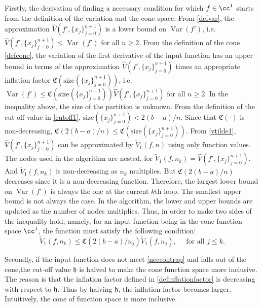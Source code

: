 \documentclass{iitthesis}
\DeclareMathOperator{\Var}{Var}
\theoremstyle{definition}
\theoremstyle{remark}
\begin{document}
Firstly, the derivation of finding a necessary condition for which $f\in\cc^1$ starts from the definition of the variation and the cone space. From \eqref{defvar}, the approximation $\widehat{V}({f'},\{x_j\}_{j=0}^{n+1})$ is a lower bound on $\Var({f'})$, i.e. $\widehat{V}({f'},\{x_j\}_{j=0}^{n+1})\leq \Var({f'})$ for all $n \ge 2$. From the definition of the cone \eqref{defcone}, the variation of the first derivative of the input function has an upper bound in terms of the approximation $\widehat{V}({f'},\{x_j\}_{j=0}^{n+1})$ times an appropriate inflation factor $\mathfrak{C}(\text{size}(\{x_j\}_{j=0}^{n+1}))$, i.e. $\Var({f'})\leq \mathfrak{C}(\text{size}(\{x_j\}_{j=0}^{n+1}))\widehat{V}({f'},\{x_j\}_{j=0}^{n+1})$ for all $n \ge 2$.
In the inequality above, the size of the partition is unknown. From the definition of the cut-off value in \eqref{cutoff1}, $\text{size}(\{x_j\}_{j=0}^{n+1})<2(b-a)/n$. Since that $\mathfrak{C}(\cdot)$ is non-decreasing, $\mathfrak{C}(2(b-a)/n)\leq \mathfrak{C}(\text{size}(\{x_j\}_{j=0}^{n+1}))$. From \eqref{vtilde1}, $\widehat{V}({f'},\{x_j\}_{j=0}^{n+1})$ can be approximated by $\widetilde{V}_1(f,n)$ using only function values. The nodes used in the algorithm are nested, for $\widetilde{V}_1(f,n_k)=\widehat{V}({f'},\{x_j\}_{j=0}^{n+1})$. And $\widetilde{V}_1(f,n_k)$ is non-decreasing as $n_k$ multiplies. But $\mathfrak{C}(2(b-a)/n)$ decreases since it is a non-decreasing function. Therefore, the largest lower bound on $\Var(f')$ is always the one at the current $k$th loop. The smallest upper bound is not always the case. In the algorithm, the lower and upper bounds are updated as the number of nodes multiplies.
Thus, in order to make two sides of the inequality hold, namely, for an input function being in the cone function space $\cc^1$, the function must satisfy the following condition:
\begin{equation}\label{neccontrap}
    \widetilde{V}_1(f,n_k)\leq\mathfrak{C}(2(b-a)/n_{j})\widetilde{V}_1(f,n_j), \quad \text{ for all } j \leq k.
\end{equation}

Secondly, if the input function does not meet \eqref{neccontrap} and falls out of the cone,the cut-off value $\mathfrak{h}$ is halved to make the cone function space more inclusive. The reason is that the inflation factor defined in \eqref{definflationfactor} is decreasing with respect to $\mathfrak{h}$. Thus by halving $\mathfrak{h}$, the inflation factor becomes larger. Intuitively, the cone of function space is more inclusive.
\end{document}
